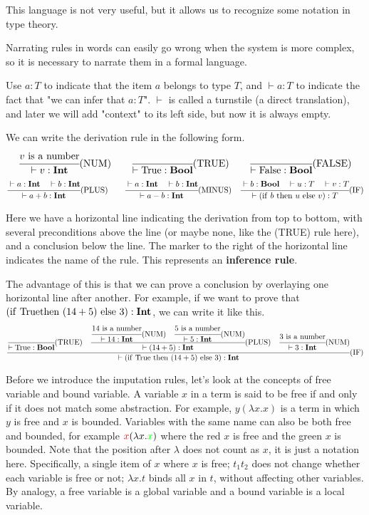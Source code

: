 \documentclass[a4paper]{exam}
\begin{document}
This language is not very useful, but it allows us to recognize some notation in type theory.

Narrating rules in words can easily go wrong when the system is more complex, so it is necessary to narrate them in a formal language.

Use $a:T$ to indicate that the item $a$ belongs to type $T$, and $\vdash a:T$ to indicate the fact that "we can infer that $a:T$". $\vdash$ is called a turnstile (a direct translation), and later we will add "context" to its left side, but now it is always empty.

We can write the derivation rule in the following form.
$$
  \cfrac{v{\rm\ is\ a\ number}}{\vdash v:{\bf Int}}{\rm\tiny(NUM)}
  \qquad\cfrac{}{\vdash {\rm True}:{\bf Bool}}{\rm\tiny(TRUE)}
  \qquad\cfrac{}{\vdash {\rm False}:{\bf Bool}}{\rm\tiny(FALSE)}
$$
$$
  \cfrac{\vdash a:{\bf Int}\quad\vdash b:{\bf Int}}{\vdash a+b:{\bf Int}}{\rm\tiny(PLUS)}
  \qquad\cfrac{\vdash a:{\bf Int}\quad\vdash b:{\bf Int}}{\vdash a-b:{\bf Int}}{\rm\tiny(MINUS)}
  \quad\cfrac{\vdash b:{\bf Bool}\quad\vdash u:T\quad\vdash v:T}{\vdash ({\rm if}\ b\ {\rm then}\ u\ {\rm else}\ v):T}{\rm\tiny(IF)}
$$

Here we have a horizontal line indicating the derivation from top to bottom, with several preconditions above the line (or maybe none, like the (TRUE) rule here), and a conclusion below the line. The marker to the right of the horizontal line indicates the name of the rule. This represents an \textbf{inference rule}.

The advantage of this is that we can prove a conclusion by overlaying one horizontal line after another. For example, if we want to prove that $({\rm if\ True\\ then}\ (14+5)\ {\rm else}\ 3):{\bf Int}$, we can write it like this.
$$
  \cfrac{
  \cfrac{}{\vdash {\rm True}:{\bf Bool}}{\rm\tiny(TRUE)}
  \quad\cfrac{
  \cfrac{14{\rm\ is\ a\ number}}{\vdash 14:{\bf Int}}{\rm\tiny(NUM)}
  \quad\cfrac{5{\rm\ is\ a\ number}}{\vdash 5:{\bf Int}}{\rm\tiny(NUM)}
  }{\vdash (14+5):{\bf Int}}{\rm\tiny(PLUS)}
  \quad\cfrac{3{\rm\ is\ a\ number}}{\vdash 3:{\bf Int}}{\rm\tiny(NUM)}
  }{\vdash ({\rm if\ True\ then}\ (14+5)\ {\rm else}\ 3):{\bf Int}}{\rm\tiny(IF)}
$$

Before we introduce the imputation rules, let's look at the concepts of free variable and bound variable.
A variable $x$ in a term is said to be free if and only if it does not match some abstraction. For example, $y(\lambda x . x)$ is a term in which $y$ is free and $x$ is bounded. Variables with the same name can also be both free and bounded, for example $\textcolor{red}{x}(\lambda x . \textcolor{green}{x})$ where the red $x$ is free and the green $x$ is bounded. Note that the position after $\lambda$ does not count as $x$, it is just a notation here.
Specifically, a single item of $x$ where $x$ is free; $t_{1} t_{2}$ does not change whether each variable is free or not; $\lambda x . t$ binds all $x$ in $t$, without affecting other variables.
By analogy, a free variable is a global variable and a bound variable is a local variable.
\end{document}
